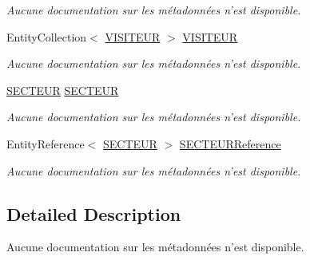 \begin{DoxyCompactItemize}
\begin{DoxyCompactList}\small\item\em Aucune documentation sur les métadonnées n'est disponible. \end{DoxyCompactList}\item 
Entity\-Collection$<$ \hyperlink{class_model_1_1_v_i_s_i_t_e_u_r}{V\-I\-S\-I\-T\-E\-U\-R} $>$ \hyperlink{class_model_1_1_r_e_g_i_o_n_a41de25bdbbf292c65117c12cc2348bf8}{V\-I\-S\-I\-T\-E\-U\-R}
\begin{DoxyCompactList}\small\item\em Aucune documentation sur les métadonnées n'est disponible. \end{DoxyCompactList}\item 
\hyperlink{class_model_1_1_s_e_c_t_e_u_r}{S\-E\-C\-T\-E\-U\-R} \hyperlink{class_model_1_1_r_e_g_i_o_n_a1a0c5b20ed4f339d95de08844b77b5b6}{S\-E\-C\-T\-E\-U\-R}
\begin{DoxyCompactList}\small\item\em Aucune documentation sur les métadonnées n'est disponible. \end{DoxyCompactList}\item 
Entity\-Reference$<$ \hyperlink{class_model_1_1_s_e_c_t_e_u_r}{S\-E\-C\-T\-E\-U\-R} $>$ \hyperlink{class_model_1_1_r_e_g_i_o_n_a30e268a49e6d95f6de38d81b420fc3b3}{S\-E\-C\-T\-E\-U\-R\-Reference}
\begin{DoxyCompactList}\small\item\em Aucune documentation sur les métadonnées n'est disponible. \end{DoxyCompactList}\end{DoxyCompactItemize}


\subsection{Detailed Description}
Aucune documentation sur les métadonnées n'est disponible. 



